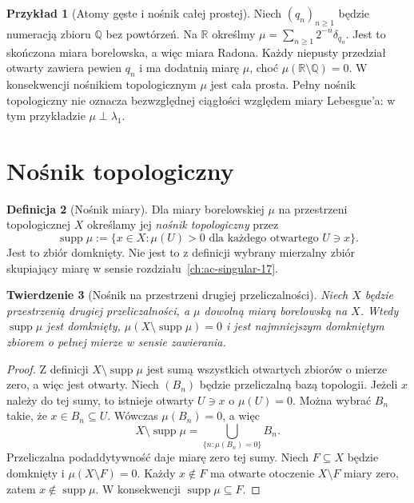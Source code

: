 \documentclass[11pt,a4paper,oneside]{book}
\numberwithin{equation}{chapter}
\theoremstyle{plain}
\newtheorem{twierdzenie}{Twierdzenie}[chapter]
\theoremstyle{definition}
\newtheorem{definicja}[twierdzenie]{Definicja}
\newtheorem{przyklad}[twierdzenie]{Przykład}
\theoremstyle{remark}
\begin{document}
\begin{przyklad}[Atomy gęste i nośnik całej prostej]
Niech $(q_n)_{n\ge1}$ będzie numeracją zbioru
$\mathbb Q$ bez powtórzeń. Na $\mathbb R$ określmy
$\mu=\sum_{n\ge1}2^{-n}\delta_{q_n}$.
Jest to skończona miara borelowska, a więc miara Radona.
Każdy niepusty przedział otwarty zawiera pewien $q_n$
i ma dodatnią miarę $\mu$, choć $\mu(\mathbb R\setminus
\mathbb Q)=0$. W konsekwencji nośnikiem topologicznym
$\mu$ jest cała prosta. Pełny nośnik topologiczny
nie oznacza bezwzględnej ciągłości względem miary Lebesgue'a:
w tym przykładzie $\mu\perp\lambda_1$.
\end{przyklad}

\section{Nośnik topologiczny}
\begin{definicja}[Nośnik miary]
\label{def:support-radon-20}
Dla miary borelowskiej $\mu$ na przestrzeni topologicznej
$X$ określamy jej \emph{nośnik topologiczny} przez
\[
\operatorname{supp}\mu
:=\{x\in X:\mu(U)>0\text{ dla każdego otwartego }
U\ni x\}.
\]
Jest to zbiór domknięty. Nie jest to z definicji
wybrany mierzalny zbiór skupiający miarę w sensie
rozdziału~\ref{ch:ac-singular-17}.
\end{definicja}

\begin{twierdzenie}[Nośnik na przestrzeni drugiej przeliczalności]
\label{thm:support-fullmass-20}
Niech $X$ będzie przestrzenią drugiej przeliczalności,
a $\mu$ dowolną miarą borelowską na $X$. Wtedy
$\operatorname{supp}\mu$ jest domknięty,
$\mu(X\setminus\operatorname{supp}\mu)=0$ i jest
najmniejszym domkniętym zbiorem o pełnej mierze
w sensie zawierania.
\end{twierdzenie}
\begin{proof}
Z definicji
$X\setminus\operatorname{supp}\mu$
jest sumą wszystkich otwartych zbiorów o mierze zero,
a więc jest otwarty. Niech $(B_n)$ będzie przeliczalną
bazą topologii. Jeżeli $x$ należy do tej sumy, to
istnieje otwarty $U\ni x$ o $\mu(U)=0$.
Można wybrać $B_n$ takie, że $x\in B_n\subseteq U$.
Wówczas $\mu(B_n)=0$, a więc
\[
X\setminus\operatorname{supp}\mu
=\bigcup_{\{n:\mu(B_n)=0\}}B_n.
\]
Przeliczalna podaddytywność daje miarę zero tej sumy.
Niech $F\subseteq X$ będzie domknięty i
$\mu(X\setminus F)=0$. Każdy $x\notin F$ ma
otwarte otoczenie $X\setminus F$ miary zero,
zatem $x\notin\operatorname{supp}\mu$.
W konsekwencji $\operatorname{supp}\mu\subseteq F$.
\end{proof}
\end{document}
